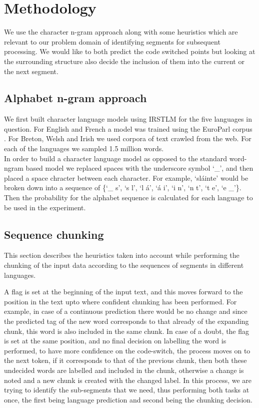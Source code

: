 \documentclass[11pt]{article}
\begin{document}
\section{Methodology}
\label{sec:method}
We use the character n-gram approach along with some heuristics which are relevant to our problem domain of identifying
segments for subsequent processing. We would like 
to both predict the code switched points but looking at the surrounding structure also decide the inclusion of them 
into the current or the next segment. \\

\subsection{Alphabet n-gram approach}
\label{alphan}

We first built character language models using IRSTLM \cite{federico08a} for the five languages in question. For English
and French a model was trained using the EuroParl corpus \cite{koehn2005europarl}. 
For Breton, Welsh and Irish we used corpora of text crawled from the web. For each of the languages we sampled 1.5 million words. \\
In order to build a character language model as opposed to the standard word-ngram based model we replaced spaces with the underscore 
symbol `\_', and then placed a space chracter between each character. For example, `sl\'{a}inte' would be broken down into a sequence 
of \{`\_ s', `s l', `l \'{a}', `\'{a} i', `i n', `n t', `t e', `e \_'\}. Then the probability for the alphabet sequence is calculated 
for each language to be used in the experiment. 

\subsection{Sequence chunking}
\label{cschunking}

This section describes the heuristics taken into account while performing the chunking of the input data according to 
the sequences of segments in different languages.

A flag is set at the beginning of the input text, and this moves forward to the position in the text upto where confident 
chunking has been performed. For example, in case of a continuous prediction there would be no change and since the 
predicted tag of the new word corresponds to that already of the expanding chunk, this word is also included in the 
same chunk. In case of a doubt, the flag is set at the same position, and no final decision on labelling the word is 
performed, to have more confidence on the code-switch, the process moves on to the next token, if it corresponds to 
that of the previous chunk, then both these undecided words are labelled and included in the chunk, otherwise a change 
is noted and a new chunk is created with the changed label. In this process, we are trying to identify the sub-segments 
that we need, thus performing both tasks at once, the first being language prediction and second being the chunking decision. 
\end{document}
